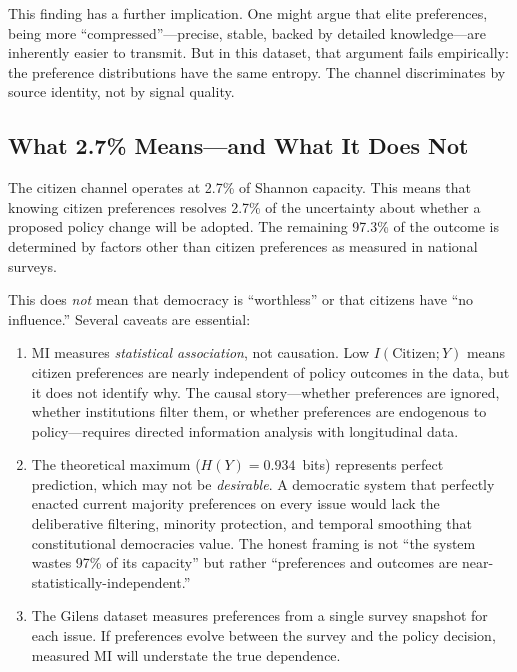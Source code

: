 \documentclass[twocolumn,10pt]{article}
\begin{document}
This finding has a further implication.  One might argue that elite preferences, being more ``compressed''---precise, stable, backed by detailed knowledge---are inherently easier to transmit.  But in this dataset, that argument fails empirically: the preference distributions have the same entropy.  The channel discriminates by source identity, not by signal quality.

\subsection{What 2.7\% Means---and What It Does Not}

The citizen channel operates at 2.7\% of Shannon capacity.  This means that knowing citizen preferences resolves 2.7\% of the uncertainty about whether a proposed policy change will be adopted.  The remaining 97.3\% of the outcome is determined by factors other than citizen preferences as measured in national surveys.

This does \emph{not} mean that democracy is ``worthless'' or that citizens have ``no influence.''  Several caveats are essential:

\begin{enumerate}
\item MI measures \emph{statistical association}, not causation.  Low $I(\text{Citizen}; Y)$ means citizen preferences are nearly independent of policy outcomes in the data, but it does not identify why.  The causal story---whether preferences are ignored, whether institutions filter them, or whether preferences are endogenous to policy---requires directed information analysis with longitudinal data.

\item The theoretical maximum ($H(Y) = 0.934$~bits) represents perfect prediction, which may not be \emph{desirable}.  A democratic system that perfectly enacted current majority preferences on every issue would lack the deliberative filtering, minority protection, and temporal smoothing that constitutional democracies value.  The honest framing is not ``the system wastes 97\% of its capacity'' but rather ``preferences and outcomes are near-statistically-independent.''

\item The Gilens dataset measures preferences from a single survey snapshot for each issue.  If preferences evolve between the survey and the policy decision, measured MI will understate the true dependence.
\end{enumerate}
\end{document}
